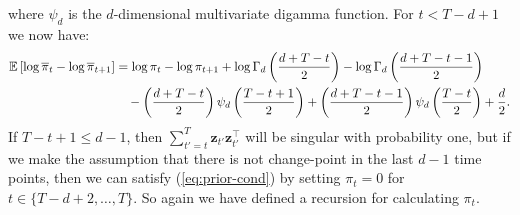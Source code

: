 where $\psi_d$ is the $d$-dimensional multivariate digamma function. For $t < T-d+1$ we now have:
\begin{align*}
    \mathbb{E}\left[\log\overline{\pi}_t - \log \overline{\pi}_{t+1} \right] &= \log \pi_t- \log \pi_{t+1} +\log \Gamma_d\left(\frac{d + T-t}{2}\right) - \log \Gamma_d\left(\frac{d + T-t-1}{2}\right) \\
    &\quad - \left(\frac{d + T - t}{2}\right)\psi_d\left(\frac{T-t+1}{2}\right) + \left(\frac{d + T - t-1}{2}\right)\psi_d\left(\frac{T-t}{2}\right) + \frac{d}{2}.
\end{align*}
If $T-t+1 \leq d-1$, then $\sum_{t'=t}^{T} \mathbf{z}_{t'}\mathbf{z}^\intercal_{t'}$  will be singular with probability one, but if we make the assumption that there is not change-point in the last $d-1$ time points, then we can satisfy (\ref{eq:prior-cond}) by setting $\pi_t = 0$ for $t \in \{T-d+2,\ldots,T\}$. So again we have defined a recursion for calculating $\pi_t$.

